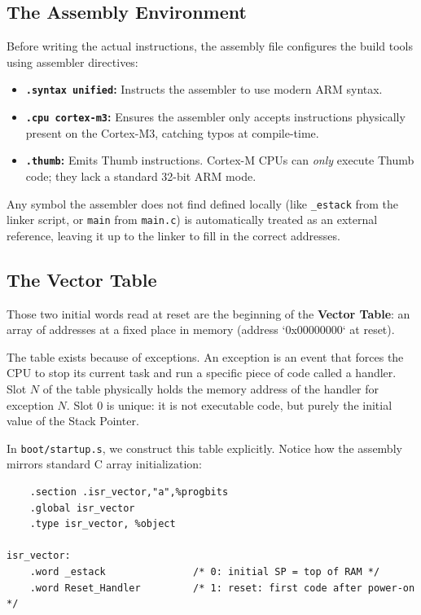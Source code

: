 \subsection{The Assembly Environment}
Before writing the actual instructions, the assembly file configures the build tools using assembler directives:
\begin{itemize}
    \item \textbf{\texttt{.syntax unified}:} Instructs the assembler to use modern ARM syntax.
    \item \textbf{\texttt{.cpu cortex-m3}:} Ensures the assembler only accepts instructions physically present on the Cortex-M3, catching typos at compile-time.
    \item \textbf{\texttt{.thumb}:} Emits Thumb instructions. Cortex-M CPUs can \textit{only} execute Thumb code; they lack a standard 32-bit ARM mode.
\end{itemize}
Any symbol the assembler does not find defined locally (like \texttt{\_estack} from the linker script, or \texttt{main} from \texttt{main.c}) is automatically treated as an external reference, leaving it up to the linker to fill in the correct addresses.

\subsection{The Vector Table}
Those two initial words read at reset are the beginning of the \textbf{Vector Table}: an array of addresses at a fixed place in memory (address `0x00000000` at reset).

The table exists because of exceptions. An exception is an event that forces the CPU to stop its current task and run a specific piece of code called a handler. Slot $N$ of the table physically holds the memory address of the handler for exception $N$. Slot 0 is unique: it is not executable code, but purely the initial value of the Stack Pointer.

In \texttt{boot/startup.s}, we construct this table explicitly. Notice how the assembly mirrors standard C array initialization:

\begin{lstlisting}
    .section .isr_vector,"a",%progbits
    .global isr_vector
    .type isr_vector, %object

isr_vector:
    .word _estack               /* 0: initial SP = top of RAM */
    .word Reset_Handler         /* 1: reset: first code after power-on */
\end{lstlisting}

